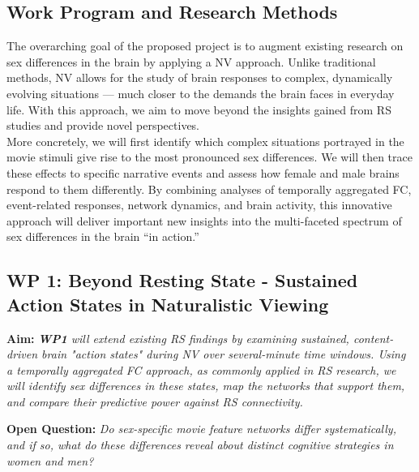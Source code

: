 \documentclass[11pt,a4paper]{article}
\begin{document}
\subsection*{Work Program and Research Methods}
The overarching goal of the proposed project is to augment existing research on sex differences in the brain by 
applying a NV approach. Unlike traditional methods, NV allows for the study of brain responses to complex, dynamically 
evolving situations — much closer to the demands the brain faces in everyday life. With this approach, we aim to move 
beyond the insights gained from RS studies and provide novel perspectives.\\
More concretely, we will first identify which complex situations portrayed in the movie stimuli give rise to the most 
pronounced sex differences. We will then trace these effects to specific narrative events and assess how female and male 
brains respond to them differently.
By combining analyses of temporally aggregated FC, event-related responses, network dynamics, and brain activity, 
this innovative approach will deliver important new insights into the multi-faceted spectrum of sex differences in the brain “in action.”\\

\subsection*{WP 1: Beyond Resting State - Sustained Action States in Naturalistic Viewing}

\textbf{Aim:} \textit{\textbf{WP1} will extend existing RS findings by examining sustained, content-driven brain "action states" 
during NV over several-minute time windows. Using a temporally aggregated FC approach, as commonly applied in RS research, 
we will identify sex differences in these states, map the networks that support them, and compare their predictive power 
against RS connectivity.}

\textbf{Open Question:} \textit{Do sex-specific movie feature networks differ systematically, and if so, 
what do these differences reveal about distinct cognitive strategies in women and men?}
\end{document}
